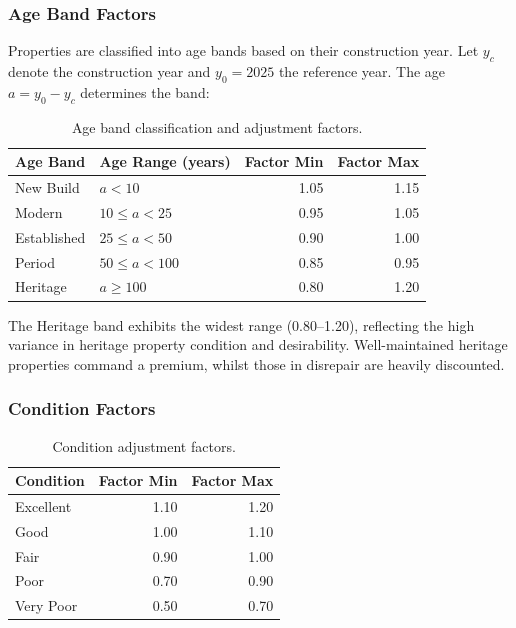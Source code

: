 \documentclass[11pt,a4paper]{article}
\begin{document}
\subsubsection{Age Band Factors}

Properties are classified into age bands based on their construction year.
Let $y_c$ denote the construction year and $y_0 = 2025$ the reference year.
The age $a = y_0 - y_c$ determines the band:

\begin{table}[H]
\centering
\caption{Age band classification and adjustment factors.}
\label{tab:age_bands}
\begin{tabular}{llrr}
\toprule
\textbf{Age Band} & \textbf{Age Range (years)} & \textbf{Factor Min} & \textbf{Factor Max} \\
\midrule
New Build    & $a < 10$       & 1.05 & 1.15 \\
Modern       & $10 \leq a < 25$  & 0.95 & 1.05 \\
Established  & $25 \leq a < 50$  & 0.90 & 1.00 \\
Period       & $50 \leq a < 100$ & 0.85 & 0.95 \\
Heritage     & $a \geq 100$      & 0.80 & 1.20 \\
\bottomrule
\end{tabular}
\end{table}

\noindent The Heritage band exhibits the widest range (0.80--1.20),
reflecting the high variance in heritage property condition and desirability.
Well-maintained heritage properties command a premium, whilst those in
disrepair are heavily discounted.

\subsubsection{Condition Factors}

\begin{table}[H]
\centering
\caption{Condition adjustment factors.}
\label{tab:condition_factors}
\begin{tabular}{lrr}
\toprule
\textbf{Condition} & \textbf{Factor Min} & \textbf{Factor Max} \\
\midrule
Excellent  & 1.10 & 1.20 \\
Good       & 1.00 & 1.10 \\
Fair       & 0.90 & 1.00 \\
Poor       & 0.70 & 0.90 \\
Very Poor  & 0.50 & 0.70 \\
\bottomrule
\end{tabular}
\end{table}
\end{document}
